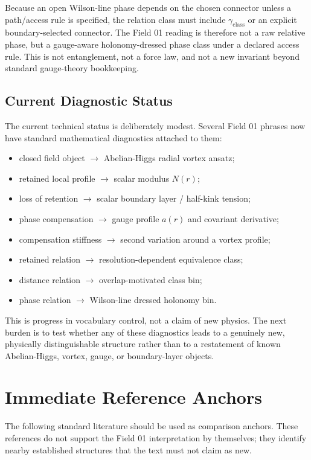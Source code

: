 \documentclass[11pt,a4paper]{article}
\begin{document}
Because an open Wilson-line phase depends on the chosen connector unless a path/access rule is specified, the relation class must include $\gamma_{\mathrm{class}}$ or an explicit boundary-selected connector. The Field 01 reading is therefore not a raw relative phase, but a gauge-aware holonomy-dressed phase class under a declared access rule. This is not entanglement, not a force law, and not a new invariant beyond standard gauge-theory bookkeeping.

\subsection{Current Diagnostic Status}

The current technical status is deliberately modest. Several Field 01 phrases now have standard mathematical diagnostics attached to them:
\begin{itemize}
\item closed field object $\rightarrow$ Abelian-Higgs radial vortex ansatz;
\item retained local profile $\rightarrow$ scalar modulus $N(r)$;
\item loss of retention $\rightarrow$ scalar boundary layer / half-kink tension;
\item phase compensation $\rightarrow$ gauge profile $a(r)$ and covariant derivative;
\item compensation stiffness $\rightarrow$ second variation around a vortex profile;
\item retained relation $\rightarrow$ resolution-dependent equivalence class;
\item distance relation $\rightarrow$ overlap-motivated class bin;
\item phase relation $\rightarrow$ Wilson-line dressed holonomy bin.
\end{itemize}

This is progress in vocabulary control, not a claim of new physics. The next burden is to test whether any of these diagnostics leads to a genuinely new, physically distinguishable structure rather than to a restatement of known Abelian-Higgs, vortex, gauge, or boundary-layer objects.

\section{Immediate Reference Anchors}

The following standard literature should be used as comparison anchors. These references do not support the Field 01 interpretation by themselves; they identify nearby established structures that the text must not claim as new.
\end{document}
